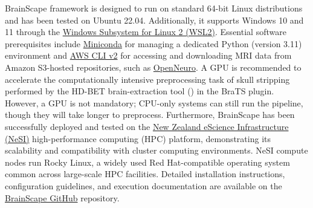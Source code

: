 BrainScape framework is designed to run on standard 64-bit Linux distributions and has been tested on Ubuntu 22.04. 
Additionally, it supports Windows 10 and 11 through the \href{https://learn.microsoft.com/en-gb/windows/wsl}{Windows Subsystem for Linux 2 (WSL2)}.
Essential software prerequisites include \href{https://www.anaconda.com/docs/getting-started/miniconda/main}{Miniconda} for managing 
a dedicated Python (version 3.11) environment  
and \href{https://docs.aws.amazon.com/cli/latest/userguide/getting-started-install.html}{AWS CLI v2} for accessing and 
downloading MRI data from Amazon S3-hosted repositories, such as \href{https://openneuro.org/}{OpenNeuro}. 
A GPU is recommended to accelerate the computationally intensive preprocessing task of skull stripping 
performed by the HD-BET brain-extraction tool (\cite{isensee2019automated}) in the BraTS plugin. 
However, a GPU is not mandatory; CPU-only systems can still run the pipeline, though they will take longer to preprocess.
Furthermore, BrainScape has been successfully deployed and tested on the 
\href{https://www.nesi.org.nz/}{New Zealand eScience Infrastructure (NeSI)} 
high-performance computing (HPC) platform, demonstrating its scalability and compatibility with cluster computing environments. 
NeSI compute nodes run Rocky Linux, a widely used Red Hat-compatible operating system common across large-scale HPC facilities. 
Detailed installation instructions, configuration guidelines, and execution documentation are available on
the \href{https://github.com/yasinzaii/BrainScape}{BrainScape GitHub} repository.

